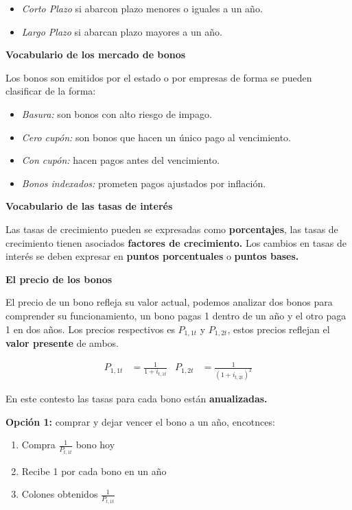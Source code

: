 \begin{itemize}
    \item \textit{Corto Plazo} si abarcon plazo menores o iguales a un año.
    \item \textit{Largo Plazo} si abarcan plazo mayores a un año.
\end{itemize}

\textbf{Vocabulario de los mercado de bonos}

Los bonos son emitidos por el estado o por empresas de forma se pueden clasificar de la forma: 

\begin{itemize}
    \item \textit{Basura:} son bonos con alto riesgo de impago. 
    \item \textit{Cero cupón:} son bonos que hacen un único pago al vencimiento.
    \item \textit{Con cupón:} hacen pagos antes del vencimiento.
    \item \textit{Bonos indexados:} prometen pagos ajustados por inflación.
\end{itemize}

\textbf{Vocabulario de las tasas de interés}

Las tasas de crecimiento pueden se expresadas como \textbf{porcentajes}, las tasas de crecimiento tienen asociados \textbf{factores de crecimiento.} Los cambios en tasas de interés se deben expresar en \textbf{puntos porcentuales} o \textbf{ puntos bases.}

\textbf{El precio de los bonos}

El precio de un bono refleja su valor actual, podemos analizar dos bonos para comprender su funcionamiento, un bono pagas 1 dentro de un año y el otro paga 1 en dos años. Los precios respectivos es $P_{1,1t}$ y $P_{1,2t}$, estos precios reflejan el \textbf{valor presente} de ambos.

\begin{align*}
    P_{1,1t} &= \frac{1}{1+i_{t,1t}} & P_{1,2t} &=\frac{1}{(1+i_{t,2t})^{2}}
\end{align*}

En este contesto las tasas para cada bono están \textbf{anualizadas.}

\textbf{Opción 1:} comprar y dejar vencer el bono a un año, encotnces:
\begin{enumerate}
    \item Compra $\frac{1}{P_{t,1t}}$ bono hoy
    \item Recibe 1 por cada bono en un año
    \item Colones obtenidos $\frac{1}{P_{t,1t}}$
\end{enumerate}

